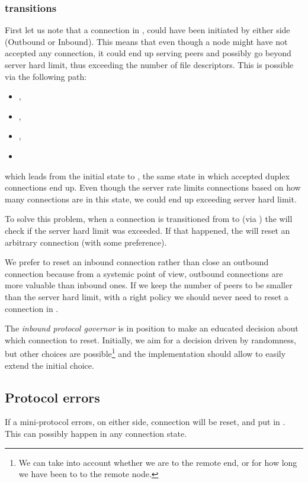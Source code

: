 \subsubsection{\Prune{} transitions}
First let us note that a connection in \InboundStateDup{}, could have been
initiated by either side (Outbound or Inbound). This means that even though a node might have not
accepted any connection, it could end up serving peers and possibly go beyond
server hard limit, thus exceeding the number of file descriptors. This is
possible via the following path:
\begin{itemize}
  \item[] \Connected{},
  \item[] \NegotiatedDupOut{},
  \item[] \PromotedToWarmDupRem{},
  \item[] \DemotedToColdDupLoc{}
\end{itemize}

which leads from the initial state \InitialState{} to \InboundStateDup{}, the
same state in which accepted duplex connections end up. Even though the server
rate limits connections based on how many connections are in this state, we
could end up exceeding server hard limit.

To solve this problem, when a connection is transitioned from
\DuplexState{} to \InboundStateDup{} (via \DemotedToColdDupLoc{}) the
\connmngr{} will check if the server hard limit was exceeded. If that
happened, the \connmngr{} will reset an arbitrary connection (with some preference).

We prefer to reset an inbound connection rather than close an outbound
connection because from a systemic point of view, outbound connections are more
valuable than inbound ones. If we keep the number of \established{} peers to
be smaller than the server hard limit, with a right policy we should never need
to reset a connection in \DuplexState{}.

The \textit{inbound protocol governor} is in position to make an educated
decision about which connection to reset. Initially, we aim for a decision driven by
randomness, but other choices are possible\footnote{We can take into account
whether we are \hot{} to the remote end, or for how long we have been \hot{} to
to the remote node.} and the implementation should allow to easily extend the
initial choice.

\subsection{Protocol errors}
If a mini-protocol errors, on either side, connection will be reset, and put in
\TerminatedState{}. This can possibly happen in any connection state.

